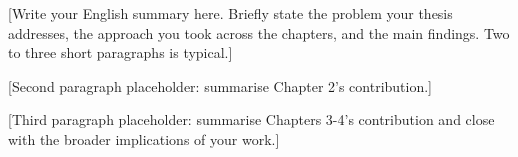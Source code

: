 [Write your English summary here. Briefly state the problem your thesis
addresses, the approach you took across the chapters, and the main findings.
Two to three short paragraphs is typical.]

[Second paragraph placeholder: summarise Chapter 2's contribution.]

[Third paragraph placeholder: summarise Chapters 3-4's contribution and close
with the broader implications of your work.]
